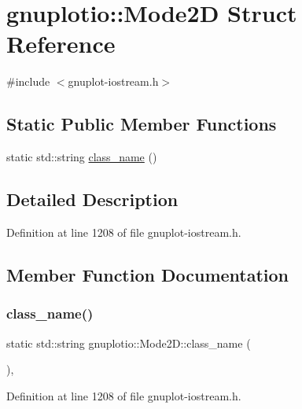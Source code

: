 \hypertarget{structgnuplotio_1_1_mode2_d}{}\section{gnuplotio\+:\+:Mode2D Struct Reference}
\label{structgnuplotio_1_1_mode2_d}


{\ttfamily \#include $<$gnuplot-\/iostream.\+h$>$}

\subsection*{Static Public Member Functions}
\begin{DoxyCompactItemize}
\item 
static std\+::string \hyperlink{structgnuplotio_1_1_mode2_d_aaf35c9cd117de8bc5dbc2d5ec1224232}{class\+\_\+name} ()
\end{DoxyCompactItemize}


\subsection{Detailed Description}


Definition at line 1208 of file gnuplot-\/iostream.\+h.



\subsection{Member Function Documentation}
\mbox{\label{structgnuplotio_1_1_mode2_d_aaf35c9cd117de8bc5dbc2d5ec1224232}} 
\subsubsection{\texorpdfstring{class\+\_\+name()}{class\_name()}}
{\footnotesize\ttfamily static std\+::string gnuplotio\+::\+Mode2\+D\+::class\+\_\+name (\begin{DoxyParamCaption}{ }\end{DoxyParamCaption})\hspace{0.3cm}{\ttfamily [inline]}, {\ttfamily [static]}}



Definition at line 1208 of file gnuplot-\/iostream.\+h.



